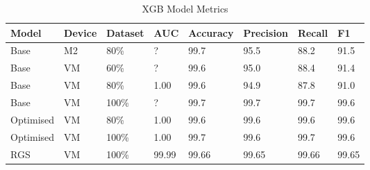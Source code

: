 \begin{table}[h]
\centering
\caption{XGB Model Metrics}
\label{tab:xgb-metrics}
\begin{tabular}{|l|l|l|l|l|l|l|l|}
\hline
\textbf{Model} & \textbf{Device} & \textbf{Dataset} & \textbf{AUC} & \textbf{Accuracy} & \textbf{Precision} & \textbf{Recall} & \textbf{F1}  \\ \hline
Base & M2 & 80\% & ? & 99.7 & 95.5 & 88.2 & 91.5 \\ \hline
Base & VM & 60\% & ? & 99.6 & 95.0 & 88.4 & 91.4 \\ \hline
Base & VM & 80\% & 1.00 & 99.6 & 94.9 & 87.8 & 91.0 \\ \hline
Base & VM & 100\% & ? & 99.7 & 99.7 & 99.7 & 99.6 \\ \hline
Optimised & VM & 80\% & 1.00 & 99.6 & 99.6 & 99.6 & 99.6 \\ \hline
Optimised & VM & 100\% & 1.00 & 99.7 & 99.6 & 99.7 & 99.6 \\ \hline
RGS & VM & 100\% & 99.99 & 99.66 & 99.65 & 99.66 & 99.65 \\ \hline
\end{tabular}
\end{table}